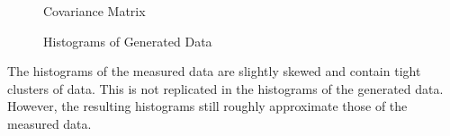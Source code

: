 \documentclass[fleqn]{article}
\begin{document}
\begin{enumerate}
\begin{enumerate}
			\begin{figure}[H]
				\centerline{}
				\caption{Covariance Matrix}
				\label{covariance_matrix}
			\end{figure}
			
			\begin{figure}[H]
				\centerline{}
				\caption{Histograms of Generated Data}
				\label{generated_data_histogram}
			\end{figure}
			
			The histograms of the measured data are slightly skewed and contain tight clusters of data. This is not replicated in the histograms of the generated data. However, the resulting histograms still roughly approximate those of the measured data.	
		\end{enumerate}
	\end{enumerate}
\end{document}

